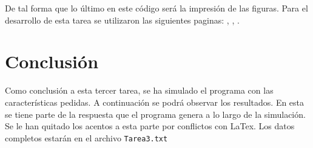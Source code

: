\documentclass{article}
\begin{document}
  De tal forma que lo último en este código será la impresión de las figuras.
  Para el desarrollo de esta tarea se utilizaron las siguientes paginas: \citep{DRA.Computo}, \citep{DRA.Medicion}, \citep{DRA.usobasico}.\\ 

\section{Conclusión}

Como conclusión a esta tercer tarea, se ha simulado el programa con las características pedidas. A continuación se podrá observar los resultados. En esta se tiene parte de la respuesta que el programa genera a lo largo de la simulación. Se le han quitado los acentos a esta parte por conflictos con LaTex. Los datos completos estarán en el archivo \texttt{Tarea3.txt}  \\
\end{document}
